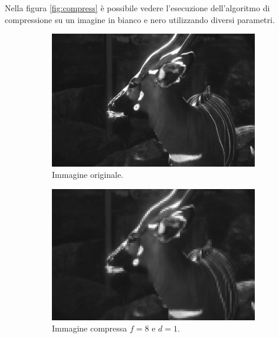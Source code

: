Nella figura \ref{fig:compress} è possibile vedere l'esecuzione dell'algoritmo di
compressione su un imagine in bianco e nero utilizzando diversi parametri.

\begin{figure}[!ht]
    \centering
    \begin{subfigure}[!ht]{0.45\textwidth}
        \includegraphics[width=\textwidth]{Progetto_2/img/gui.png}
        \caption{Immagine originale.}
    \end{subfigure}
    \begin{subfigure}[!ht]{0.45\textwidth}
        \includegraphics[width=\textwidth]{Progetto_2/img/gui_compressed1.png}
        \caption{Immagine compressa $f = 8$ e $d = 1$.}
    \end{subfigure}
    \begin{subfigure}[!ht]{0.45\textwidth}

\end{subfigure}
\end{figure}
